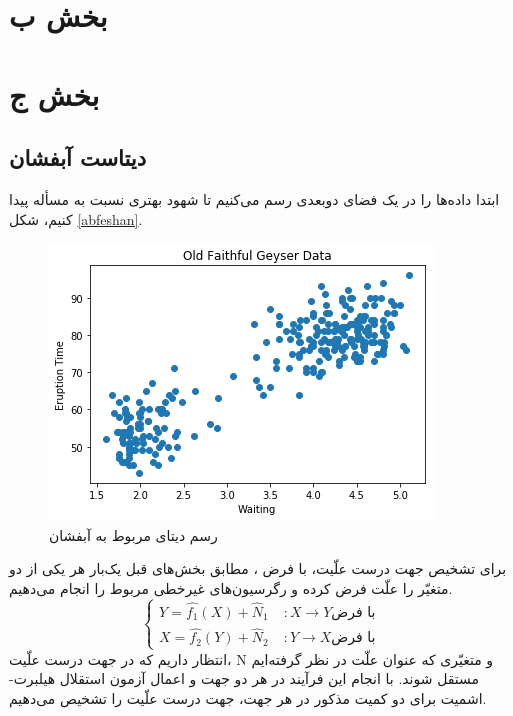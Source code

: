 \documentclass[papersize=a4]{report}
\begin{document}
\section{بخش ب}
\section{بخش ج}
\subsection{دیتاست آبفشان}

ابتدا داده‌ها را در یک فضای دو‌بعدی رسم می‌کنیم تا شهود بهتری نسبت به مسأله پیدا کنیم، شکل \eqref{abfeshan}.
\begin{figure}[h]
	\centering
	\includegraphics[scale=0.45]{old1.png}
	\caption{رسم دیتای مربوط به آبفشان}
	\label{abfeshan}
\end{figure}

برای تشخیص جهت درست علّیت،  با فرض ، مطابق بخش‌های قبل یک‌بار هر یکی از دو متغیّر را علّت فرض کرده و رگرسیون‌های غیرخطی مربوط را انجام می‌دهیم.  
$$
\begin{cases}
Y = \hat{f_1}(X) + \hat{N}_1 &\;  :X \rightarrow Y \text{با فرض}  \\
X = \hat{f_2}(Y) + \hat{N}_2 &\;  :Y \rightarrow X \text{با فرض}
\end{cases}
$$
انتظار داریم که در جهت درست علّیت، N و متغیّری که عنوان علّت در نظر گرفته‌ایم مستقل شوند. با انجام این فرآیند در هر دو جهت و اعمال آزمون استقلال هیلبرت-اشمیت برای دو کمیت مذکور در هر جهت، جهت درست علّیت را تشخیص می‌دهیم.
\end{document}
